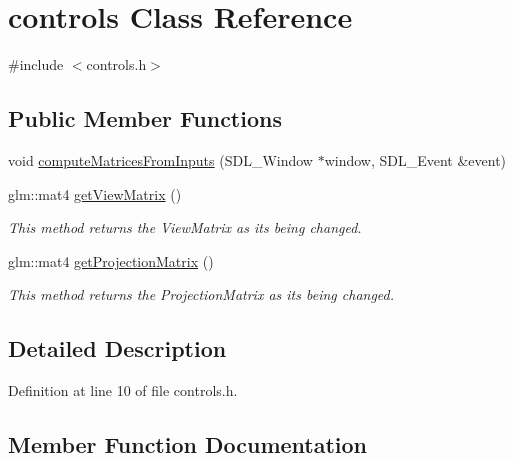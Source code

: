 \hypertarget{classcontrols}{}\section{controls Class Reference}
\label{classcontrols}


{\ttfamily \#include $<$controls.\+h$>$}

\subsection*{Public Member Functions}
\begin{DoxyCompactItemize}
\item 
void \hyperlink{classcontrols_a863dd3b5081bda5fa76c5600f9e56fef}{compute\+Matrices\+From\+Inputs} (S\+D\+L\+\_\+\+Window $\ast$window, S\+D\+L\+\_\+\+Event \&event)
\item 
glm\+::mat4 \hyperlink{classcontrols_a55656fed062f5e4e974ad812474521fa}{get\+View\+Matrix} ()
\begin{DoxyCompactList}\small\item\em This method returns the View\+Matrix as its being changed. \end{DoxyCompactList}\item 
glm\+::mat4 \hyperlink{classcontrols_ada3a547ab60b0288d757107333020f94}{get\+Projection\+Matrix} ()
\begin{DoxyCompactList}\small\item\em This method returns the Projection\+Matrix as its being changed. \end{DoxyCompactList}\end{DoxyCompactItemize}


\subsection{Detailed Description}


Definition at line 10 of file controls.\+h.



\subsection{Member Function Documentation}
\hypertarget{classcontrols_a863dd3b5081bda5fa76c5600f9e56fef}{}
